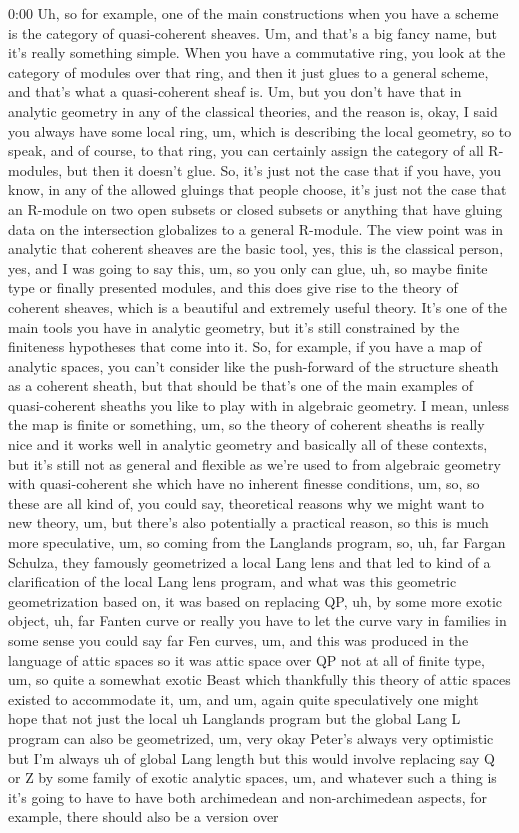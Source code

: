 \begin{unfinished}{0:00}
Uh, so for example, one of the main constructions when you have a scheme is the category of quasi-coherent sheaves. Um, and that's a big fancy name, but it's really something simple. When you have a commutative ring, you look at the category of modules over that ring, and then it just glues to a general scheme, and that's what a quasi-coherent sheaf is. Um, but you don't have that in analytic geometry in any of the classical theories, and the reason is, okay, I said you always have some local ring, um, which is describing the local geometry, so to speak, and of course, to that ring, you can certainly assign the category of all R-modules, but then it doesn't glue. So, it's just not the case that if you have, you know, in any of the allowed gluings that people choose, it's just not the case that an R-module on two open subsets or closed subsets or anything that have gluing data on the intersection globalizes to a general R-module. The view point was in analytic that coherent sheaves are the basic tool, yes, this is the classical person, yes, and I was going to say this, um, so you only can glue, uh, so maybe finite type or finally presented modules, and this does give rise to the theory of coherent sheaves, which is a beautiful and extremely useful theory. It's one of the main tools you have in analytic geometry, but it's still constrained by the finiteness hypotheses that come into it. So, for example, if you have a map of analytic spaces, you can't consider like the push-forward of the structure sheath as a coherent sheath, but that should be that's one of the main examples of quasi-coherent sheaths you like to play with in algebraic geometry. I mean, unless the map is finite or something, um, so the theory of coherent sheaths is really nice and it works well in analytic geometry and basically all of these contexts, but it's still not as general and flexible as we're used to from algebraic geometry with quasi-coherent she which have no inherent finesse conditions, um, so, so these are all kind of, you could say, theoretical reasons why we might want to new theory, um, but there's also potentially a practical reason, so this is much more speculative, um, so coming from the Langlands program, so, uh, far Fargan Schulza, they famously geometrized a local Lang lens and that led to kind of a clarification of the local Lang lens program, and what was this geometric geometrization based on, it was based on replacing QP, uh, by some more exotic object, uh, far Fanten curve or really you have to let the curve vary in families in some sense you could say far Fen curves, um, and this was produced in the language of attic spaces so it was attic space over QP not at all of finite type, um, so quite a somewhat exotic Beast which thankfully this theory of attic spaces existed to accommodate it, um, and um, again quite speculatively one might hope that not just the local uh Langlands program but the global Lang L program can also be geometrized, um, very okay Peter's always very optimistic but I'm always uh of global Lang length but this would involve replacing say Q or Z by some family of exotic analytic spaces, um, and whatever such a thing is it's going to have to have both archimedean and non-archimedean aspects, for example, there should also be a version over 
\end{unfinished}
